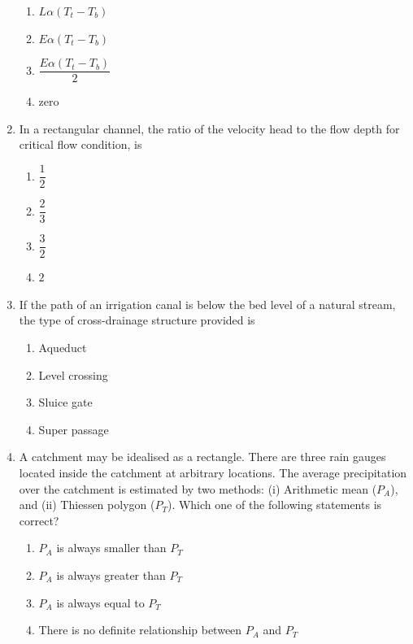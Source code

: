 \documentclass[journal,12pt,onecolumn]{IEEEtran}
\theoremstyle{remark}
\begin{document}
\begin{enumerate}
\hfill{}
\begin{enumerate}
\item $L\alpha(T_t - T_b)$
\item $E\alpha(T_t - T_b)$
\item $\dfrac{E\alpha(T_t - T_b)}{2}$
\item zero
\end{enumerate}

\item In a rectangular channel, the ratio of the velocity head to the flow depth for critical flow condition, is

\hfill{}
\begin{enumerate}
\item $\dfrac{1}{2}$
\item $\dfrac{2}{3}$
\item $\dfrac{3}{2}$
\item $2$
\end{enumerate}

\item If the path of an irrigation canal is below the bed level of a natural stream, the type of cross-drainage structure provided is

\hfill{}
\begin{enumerate}
\item Aqueduct
\item Level crossing
\item Sluice gate
\item Super passage
\end{enumerate}

\item A catchment may be idealised as a rectangle. There are three rain gauges located inside the catchment at arbitrary locations. The average precipitation over the catchment is estimated by two methods: (i) Arithmetic mean ($P_A$), and (ii) Thiessen polygon ($P_T$). Which one of the following statements is correct?

\hfill{}
\begin{enumerate}
\item $P_A$ is always smaller than $P_T$
\item $P_A$ is always greater than $P_T$
\item $P_A$ is always equal to $P_T$
\item There is no definite relationship between $P_A$ and $P_T$
\end{enumerate}


\end{enumerate}
\end{document}
